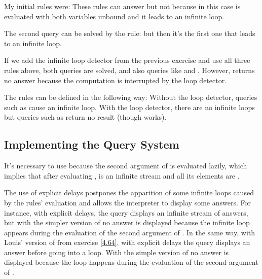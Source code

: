 \begin{exe}[4.68]
    My initial rules were:
    These rules can answer  but not
     because in this case
     is evaluated with both variables 
    unbound and it leads to an infinite loop.

    The second query can be solved by the rule:
    but then it’s the first one that leads to an infinite loop.

    If we add the infinite loop detector from the previous exercise and use all 
    three rules above, both queries are solved, and also queries like
     and
    . However,
     returns no answer because the 
    computation is interrupted by the loop detector.
\end{exe}

\begin{exe}[4.69]
    The rules can be defined in the following way:
    Without the loop detector, queries such as  cause an 
    infinite loop. With the loop detector, there are no infinite loops but 
    queries such as  return no result 
    (though  works).
\end{exe}

\subsection{Implementing the Query System}

\begin{exe}[4.70]
    It’s necessary to use  because the second argument of 
     is evaluated lazily, which implies that after evaluating
    , 
     is an infinite stream and all its elements are 
    .
\end{exe}

\begin{exe}[4.71]
    The use of explicit delays postpones the apparition of some infinite loops 
    caused by the rules’ evaluation and allows the interpreter to display some 
    answers. For instance, with explicit delays, the query
     displays an infinite stream of answers, but 
    with the simpler version of  no answer is displayed 
    because the infinite loop appears during the evaluation of the second 
    argument of . In the same way, with Louis’ version of 
     from exercise \ref{4.64}, with explicit delays the query
     displays an answer before going 
    into a loop. With the simple version of  no answer is 
    displayed because the loop happens during the evaluation of the second 
    argument of .
\end{exe}
